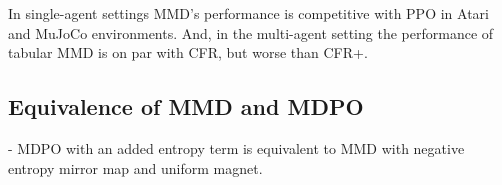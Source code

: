 


In single-agent settings MMD's performance is competitive with PPO in Atari and MuJoCo
environments.
And, in the multi-agent setting the performance of tabular MMD is on par with CFR, but worse than
CFR+.

\subsection{Equivalence of MMD and MDPO}

- MDPO with an added entropy term is equivalent to MMD with negative entropy mirror map and
uniform magnet.